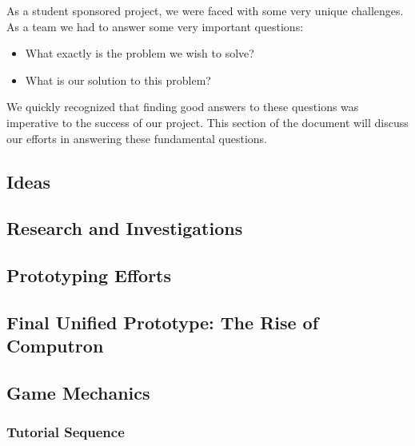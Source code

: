 As a student sponsored project, we were faced with some very unique
challenges. As a team we had to answer some very important questions:

\begin{itemize}
    \item What exactly is the problem we wish to solve?
    \item What is our solution to this problem?
\end{itemize}

We quickly recognized that finding good answers to these questions was imperative to the success of our project.
This section of the document will discuss our efforts in answering these fundamental questions.

\subsection{Ideas}
  
\newpage

\subsection{Research and Investigations}
  
\newpage

\subsection{Prototyping Efforts}
  
\newpage

\subsection{Final Unified Prototype: The Rise of Computron}
  
\newpage

\subsection{Game Mechanics}
\subsubsection{Tutorial Sequence}
\label{section:tutorial}
  
\newpage
